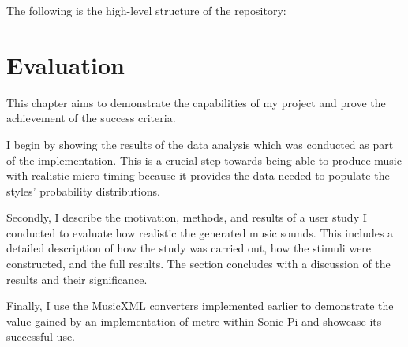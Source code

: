 \documentclass[12pt,twoside,openright]{report}
\begin{document}
The following is the high-level structure of the repository:
\vspace{5mm}





\chapter{Evaluation} \label{evaluation}

This chapter aims to demonstrate the capabilities of my project and prove the
achievement of the success criteria.

I begin by showing the results of the
data analysis which was conducted as part of the implementation. This is a
crucial step towards being able to produce music with realistic micro-timing
because it provides the data needed to populate the styles' probability
distributions.

Secondly, I describe the motivation, methods, and results of
a user study I conducted to evaluate how realistic the generated music sounds.
This includes a detailed description of how the study was carried out, how the
stimuli were constructed, and the full results. The section concludes with a
discussion of the results and their significance.

Finally, I use the MusicXML
converters implemented earlier to demonstrate the value gained by an
implementation of metre within Sonic Pi and showcase its successful use.
\end{document}
